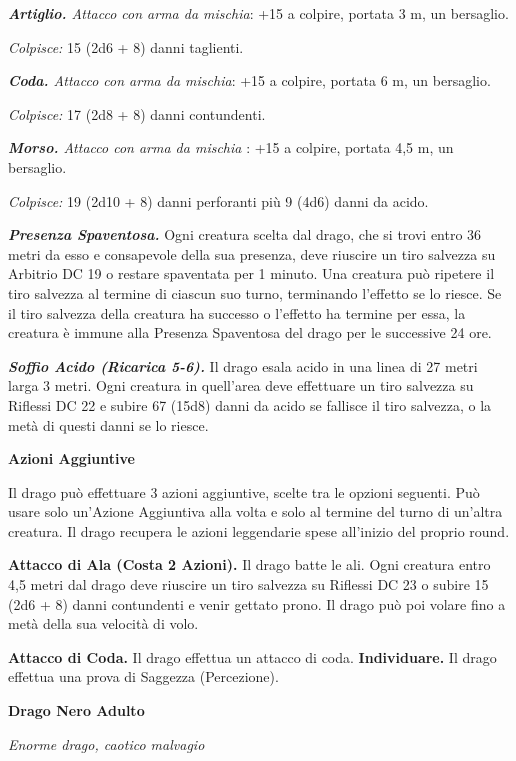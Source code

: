 \begin{multicols}{2}
\emph{\textbf{Artiglio.} Attacco con arma da mischia}: +15 a colpire,
portata 3 m, un bersaglio.

\emph{Colpisce:} 15 (2d6 + 8) danni taglienti.

\emph{\textbf{Coda.} Attacco con arma da mischia}: +15 a colpire,
portata 6 m, un bersaglio.

\emph{Colpisce:} 17 (2d8 + 8) danni contundenti.

\emph{\textbf{Morso.} Attacco con arma da mischia} : +15 a colpire,
portata 4,5 m, un bersaglio.

\emph{Colpisce:} 19 (2d10 + 8) danni perforanti più 9 (4d6) danni da
acido.

\emph{\textbf{Presenza Spaventosa.}} Ogni creatura scelta dal drago, che
si trovi entro 36 metri da esso e consapevole della sua presenza, deve
riuscire un tiro salvezza su Arbitrio DC 19 o restare spaventata per 1
minuto. Una creatura può ripetere il tiro salvezza al termine di ciascun
suo turno, terminando l'effetto se lo riesce. Se il tiro salvezza della
creatura ha successo o l'effetto ha termine per essa, la creatura è
immune alla Presenza Spaventosa del drago per le successive 24 ore.

\emph{\textbf{Soffio Acido (Ricarica 5-6).}} Il drago esala acido in una
linea di 27 metri larga 3 metri. Ogni creatura in quell'area deve
effettuare un tiro salvezza su Riflessi DC 22 e subire 67 (15d8) danni
da acido se fallisce il tiro salvezza, o la metà di questi danni se lo
riesce.

\textbf{Azioni Aggiuntive}

Il drago può effettuare 3 azioni aggiuntive, scelte tra le opzioni
seguenti. Può usare solo un'Azione Aggiuntiva alla volta e solo al
termine del turno di un'altra creatura. Il drago recupera le azioni
leggendarie spese all'inizio del proprio round.

\textbf{Attacco di Ala (Costa 2 Azioni).} Il drago batte le ali. Ogni
creatura entro 4,5 metri dal drago deve riuscire un tiro salvezza su Riflessi DC 23 o subire 15 (2d6 + 8) danni contundenti e venir gettato
prono. Il drago può poi volare fino a metà della sua velocità di volo.

\textbf{Attacco di Coda.} Il drago effettua un attacco di coda.
\textbf{Individuare.} Il drago effettua una prova di Saggezza
(Percezione).



\textbf{Drago Nero Adulto}

\emph{Enorme drago, caotico malvagio}


\end{multicols}
